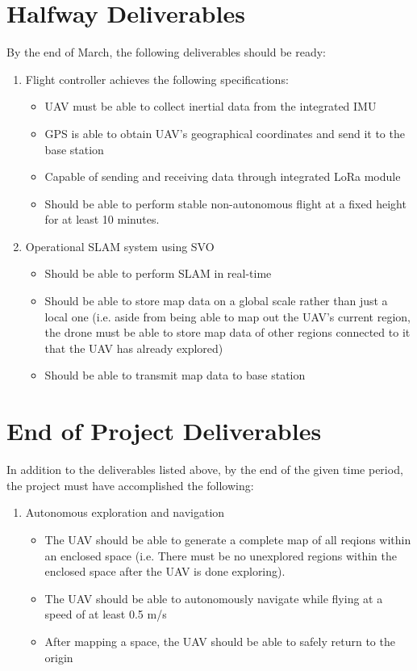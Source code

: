 \documentclass[english]{upeeei}
\begin{document}
\section{Halfway Deliverables}
By the end of March, the following deliverables should be ready:
\begin{enumerate}
    \item Flight controller achieves the following specifications:
    \begin{itemize}
        \item UAV must be able to collect inertial data from the integrated IMU
        \item GPS is able to obtain UAV's geographical coordinates and send it to the base station
        \item Capable of sending and receiving data through integrated LoRa module
        \item Should be able to perform stable non-autonomous flight at a fixed height for at least 10 minutes.
    \end{itemize}
    \item Operational SLAM system using SVO
    \begin{itemize}
        \item Should be able to perform SLAM in real-time
        \item Should be able to store map data on a global scale rather than just a local one (i.e. aside from being able
        to map out the UAV's current region, the drone must be able to store map data of other regions connected to it that
        the UAV has already explored)
        \item Should be able to transmit map data to base station
    \end{itemize}
\end{enumerate}

\section{End of Project Deliverables}
In addition to the deliverables listed above, by the end of the given time period, the project must have accomplished
the following:
\begin{enumerate}
    \item Autonomous exploration and navigation
    \begin{itemize}
        \item The UAV should be able to generate a complete map of all reqions within an enclosed space (i.e. There must be
        no unexplored regions within the enclosed space after the UAV is done exploring).
        \item The UAV should be able to autonomously navigate while flying at a speed of at least 0.5 m/s
        \item After mapping a space, the UAV should be able to safely return to the origin
    \end{itemize}
\end{enumerate}
\printbibliography[
heading=bibintoc,
title={Bibliography}
]
\end{document}
